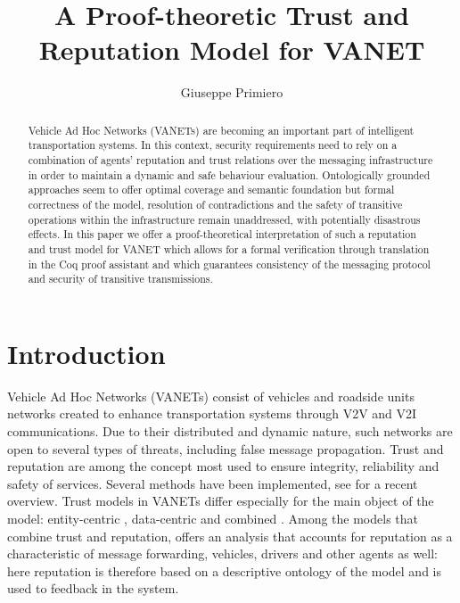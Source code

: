 \documentclass[compsoc, conference, letterpaper, 10pt, times]{IEEEtran}
\begin{document}
\title{A Proof-theoretic Trust and Reputation Model for VANET}
\author{Giuseppe Primiero}





\maketitle

\begin{abstract}
Vehicle Ad Hoc Networks (VANETs) are becoming an important part of intelligent transportation systems. In this context, security requirements need to rely on a combination of agents' reputation and trust relations over the messaging infrastructure in order to maintain a dynamic and safe behaviour evaluation. Ontologically grounded approaches seem to offer optimal coverage and semantic foundation but formal correctness of the model, resolution of contradictions and the safety of transitive operations within the infrastructure remain unaddressed, with potentially disastrous effects. In this paper we offer a proof-theoretical interpretation of such a reputation and trust model for VANET which allows for a formal verification through translation in the Coq proof assistant and which guarantees consistency of the messaging protocol and security of transitive transmissions.
\end{abstract}


\section{Introduction}\label{sec:intro}

Vehicle Ad Hoc Networks (VANETs) consist of vehicles and roadside units networks created to enhance transportation systems through V2V and V2I communications. Due to their distributed and dynamic nature, such networks are open to several types of threats, including false message propagation. Trust and reputation are among the concept most used to ensure integrity, reliability  and safety of services. Several methods have been implemented, see \cite{Soleymani2015} for a recent overview. Trust models in VANETs differ especially for the main object of the model: entity-centric \cite{5641621, GomezMarmol:2012:TTR:2160992.2161100}, data-centric \cite{conf/infocom/RayaPGH08, Lo2009} and combined \cite{Wei2012}. Among the models that combine trust and reputation, \cite{glenford} offers an analysis that accounts for reputation as a characteristic of message forwarding, vehicles, drivers and other agents as well: here reputation is therefore based on a descriptive ontology of the model and is used to feedback in the system. 
\end{document}
